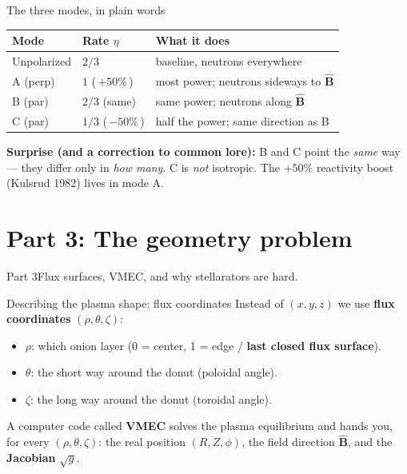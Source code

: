 \documentclass[11pt,aspectratio=169]{beamer}
\newcommand{\key}[1]{\textcolor{key}{\textbf{#1}}}
\newcommand{\bhat}{\hat{\mathbf{B}}}
\begin{document}
\begin{frame}{The three modes, in plain words}
\begin{tabular}{lll}
\key{Mode} & \key{Rate $\eta$} & \key{What it does}\\\hline
Unpolarized & $2/3$ & baseline, neutrons everywhere\\
A (perp)    & $1$ (\,$+50\%$\,) & most power; neutrons sideways to $\bhat$\\
B (par)     & $2/3$ (same) & same power; neutrons along $\bhat$\\
C (par)     & $1/3$ (\,$-50\%$\,) & half the power; same direction as B\\
\end{tabular}
\vfill
\key{Surprise (and a correction to common lore):} B and C point the \emph{same} way ---
they differ only in \emph{how many}. C is \emph{not} isotropic. The $+50\%$ reactivity boost
(Kulsrud 1982) lives in mode A.
\end{frame}

\section{Part 3: The geometry problem}
\begin{frame}{Part 3}\Large Flux surfaces, VMEC, and why stellarators are hard.\end{frame}

\begin{frame}{Describing the plasma shape: flux coordinates}
Instead of $(x,y,z)$ we use \key{flux coordinates} $(\rho,\theta,\zeta)$:
\begin{itemize}
\item $\rho$: which onion layer (0 = center, 1 = edge / \key{last closed flux surface}).
\item $\theta$: the short way around the donut (poloidal angle).
\item $\zeta$: the long way around the donut (toroidal angle).
\end{itemize}
A computer code called \key{VMEC} solves the plasma equilibrium and hands you, for every
$(\rho,\theta,\zeta)$: the real position $(R,Z,\phi)$, the field direction $\bhat$, and the
\key{Jacobian} $\sqrt{g}$.
\end{frame}
\end{document}
